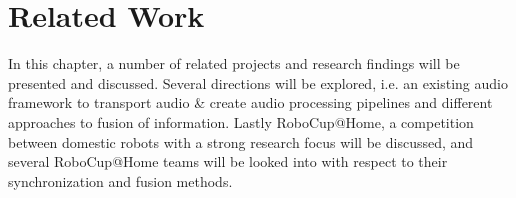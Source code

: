 
\chapter{Related Work}

In this chapter, a number of related projects and research findings will be presented and discussed. 
Several directions will be explored, i.e. an existing audio framework to transport audio \& create audio processing pipelines and different approaches to fusion of information.
Lastly RoboCup@Home, a competition between domestic robots with a strong research focus will be discussed, and several RoboCup@Home teams will be looked into with respect to their synchronization and fusion methods.



